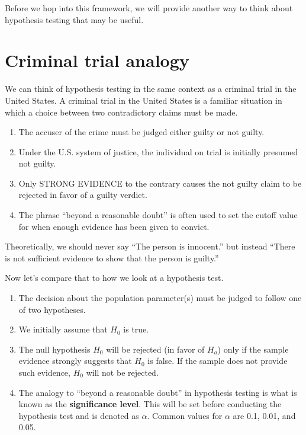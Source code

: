 \documentclass[]{tufte-book}
\begin{document}
Before we hop into this framework, we will provide another way to think
about hypothesis testing that may be useful.

\section{Criminal trial analogy}\label{trial}

We can think of hypothesis testing in the same context as a criminal
trial in the United States. A criminal trial in the United States is a
familiar situation in which a choice between two contradictory claims
must be made.

\begin{enumerate}
\def\labelenumi{\arabic{enumi}.}
\item
  The accuser of the crime must be judged either guilty or not guilty.
\item
  Under the U.S. system of justice, the individual on trial is initially
  presumed not guilty.
\item
  Only STRONG EVIDENCE to the contrary causes the not guilty claim to be
  rejected in favor of a guilty verdict.
\item
  The phrase ``beyond a reasonable doubt'' is often used to set the
  cutoff value for when enough evidence has been given to convict.
\end{enumerate}

Theoretically, we should never say ``The person is innocent.'' but
instead ``There is not sufficient evidence to show that the person is
guilty.''

Now let's compare that to how we look at a hypothesis test.

\begin{enumerate}
\def\labelenumi{\arabic{enumi}.}
\item
  The decision about the population parameter(s) must be judged to
  follow one of two hypotheses.
\item
  We initially assume that \(H_0\) is true.
\item
  The null hypothesis \(H_0\) will be rejected (in favor of \(H_a\))
  only if the sample evidence strongly suggests that \(H_0\) is false.
  If the sample does not provide such evidence, \(H_0\) will not be
  rejected.
\item
  The analogy to ``beyond a reasonable doubt'' in hypothesis testing is
  what is known as the \textbf{significance level}. This will be set
  before conducting the hypothesis test and is denoted as \(\alpha\).
  Common values for \(\alpha\) are 0.1, 0.01, and 0.05.
\end{enumerate}
\end{document}
